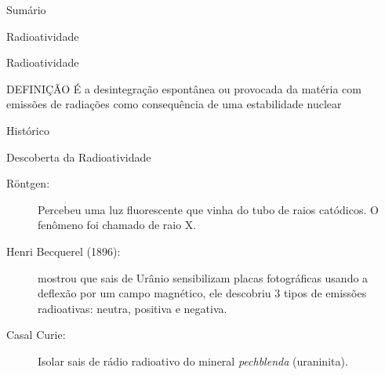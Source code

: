 \documentclass[presentation]{beamer}
\date{\today}
\title{}
\begin{document}
\begin{frame}{Sumário}
\tableofcontents
\end{frame}

\begin{frame}[label={sec:org6f03e86}]{Radioatividade}
\begin{block}{Radioatividade}
\begin{bclogo}[logo=\bcdanger]{DEFINIÇÃO}
É a desintegração espontânea ou provocada da matéria com emissões de radiações como consequência de uma estabilidade nuclear
\end{bclogo}
\end{block}
\end{frame}


\begin{frame}[label={sec:org1b144ef}]{Histórico}
\begin{block}{Descoberta da Radioatividade}
\begin{description}
\item[{Röntgen:}] Percebeu uma luz fluorescente que vinha do tubo de raios catódicos. O fenômeno foi chamado de raio X.
\item[{Henri Becquerel (1896):}] mostrou que sais de Urânio sensibilizam placas fotográficas usando  a deflexão por um campo magnético, ele descobriu 3 tipos de emissões radioativas: \alert{neutra}, \alert{positiva} e \alert{negativa}.
\item[{Casal Curie:}] Isolar sais de rádio radioativo do mineral \emph{pechblenda} (uraninita).
\end{description}
\end{block}
\end{frame}
\end{document}
